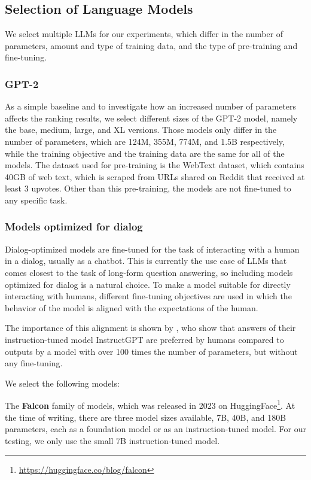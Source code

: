 \subsection{Selection of Language Models}
We select multiple LLMs for our experiments, which differ in the number of parameters, amount and type of training data, and the type of pre-training and fine-tuning.

\subsubsection{GPT-2}
As a simple baseline and to investigate how an increased number of parameters affects the ranking results, we select different sizes of the GPT-2 model, namely the base, medium, large, and XL versions.
Those models only differ in the number of parameters, which are 124M, 355M, 774M, and 1.5B respectively, while the training objective and the training data are the same for all of the models.
The dataset used for pre-training is the WebText dataset, which contains 40GB of web text, which is scraped from URLs shared on Reddit that received at least 3 upvotes.
Other than this pre-training, the models are not fine-tuned to any specific task.

\subsubsection{Models optimized for dialog}\label{sec:dialog-models}
Dialog-optimized models are fine-tuned for the task of interacting with a human in a dialog, usually as a chatbot.
This is currently the use case of LLMs that comes closest to the task of long-form question answering, so including models optimized for dialog is a natural choice.
To make a model suitable for directly interacting with humans, different fine-tuning objectives are used in which the behavior of the model is aligned with the expectations of the human.

The importance of this alignment is shown by \cite{ouyang:2022:Training}, who show that answers of their instruction-tuned model InstructGPT are preferred by humans compared to outputs by a model with over 100 times the number of parameters, but without any fine-tuning.

We select the following models:

The \textbf{Falcon} family of models, which was released in 2023 on HuggingFace\footnote{\url{https://huggingface.co/blog/falcon}}.
At the time of writing, there are three model sizes available, 7B, 40B, and 180B parameters, each as a foundation model or as an instruction-tuned model.
For our testing, we only use the small 7B instruction-tuned model.

